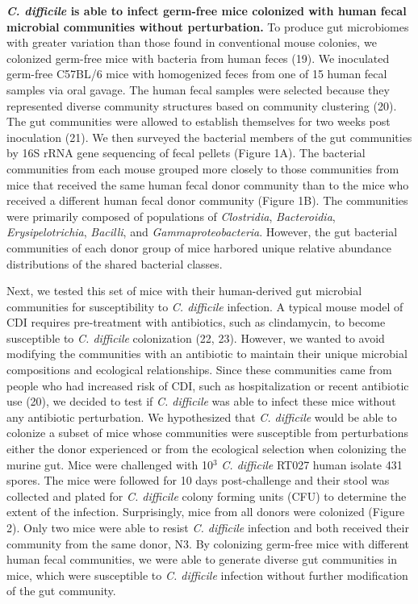 \documentclass[
  12pt,
]{article}
\begin{document}
\textbf{\emph{C. difficile} is able to infect germ-free mice colonized
with human fecal microbial communities without perturbation.} To produce
gut microbiomes with greater variation than those found in conventional
mouse colonies, we colonized germ-free mice with bacteria from human
feces (19). We inoculated germ-free C57BL/6 mice with homogenized feces
from one of 15 human fecal samples via oral gavage. The human fecal
samples were selected because they represented diverse community
structures based on community clustering (20). The gut communities were
allowed to establish themselves for two weeks post inoculation (21). We
then surveyed the bacterial members of the gut communities by 16S rRNA
gene sequencing of fecal pellets (Figure 1A). The bacterial communities
from each mouse grouped more closely to those communities from mice that
received the same human fecal donor community than to the mice who
received a different human fecal donor community (Figure 1B). The
communities were primarily composed of populations of \emph{Clostridia},
\emph{Bacteroidia}, \emph{Erysipelotrichia}, \emph{Bacilli}, and
\emph{Gammaproteobacteria}. However, the gut bacterial communities of
each donor group of mice harbored unique relative abundance
distributions of the shared bacterial classes.

Next, we tested this set of mice with their human-derived gut microbial
communities for susceptibility to \emph{C. difficile} infection. A
typical mouse model of CDI requires pre-treatment with antibiotics, such
as clindamycin, to become susceptible to \emph{C. difficile}
colonization (22, 23). However, we wanted to avoid modifying the
communities with an antibiotic to maintain their unique microbial
compositions and ecological relationships. Since these communities came
from people who had increased risk of CDI, such as hospitalization or
recent antibiotic use (20), we decided to test if \emph{C. difficile}
was able to infect these mice without any antibiotic perturbation. We
hypothesized that \emph{C. difficile} would be able to colonize a subset
of mice whose communities were susceptible from perturbations either the
donor experienced or from the ecological selection when colonizing the
murine gut. Mice were challenged with 10\(^{3}\) \emph{C. difficile}
RT027 human isolate 431 spores. The mice were followed for 10 days
post-challenge and their stool was collected and plated for \emph{C.
difficile} colony forming units (CFU) to determine the extent of the
infection. Surprisingly, mice from all donors were colonized (Figure 2).
Only two mice were able to resist \emph{C. difficile} infection and both
received their community from the same donor, N3. By colonizing
germ-free mice with different human fecal communities, we were able to
generate diverse gut communities in mice, which were susceptible to
\emph{C. difficile} infection without further modification of the gut
community.
\end{document}
